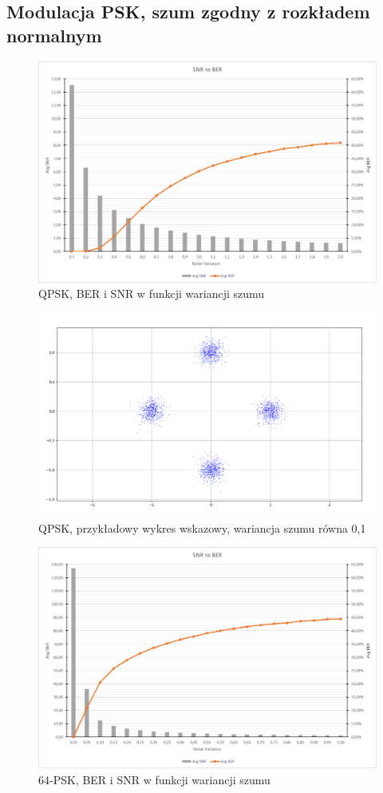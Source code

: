 \documentclass{article}
\begin{document}
	\subsection{Modulacja PSK, szum zgodny z rozkładem normalnym}
		\begin{figure}[H]
			\centering
			\includegraphics[width=0.8\linewidth]{img/chart/qpsk_snr_ber.png}
			\caption{QPSK, BER i SNR w funkcji wariancji szumu}
			\label{fig:qpsk_snr_ber}
		\end{figure}

		\begin{figure}[H]
			\centering
		  	\includegraphics[width=0.8\linewidth]{img/chart/qpsk_var01_const.png}
		  	\caption{QPSK, przykładowy wykres wskazowy, wariancja szumu równa 0,1}
			\label{fig:qpsk_const}
		\end{figure}

		\begin{figure}[H]
			\centering
			\includegraphics[width=0.8\linewidth]{img/chart/64psk_snr_ber.png}
			\caption{64-PSK, BER i SNR w funkcji wariancji szumu}
			\label{fig:64psk_snr_ber}
		\end{figure}
\end{document}
